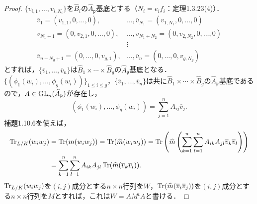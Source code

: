 \begin{proof}
  $\{v_{i,1},\ldots,v_{i,N_i}\}$を$\widehat{B}_i$の$\widehat{A}_\mathfrak{p}$基底とする（$N_i=e_if_i$：定理1.3.23(4)）．
  \begin{align*}
    \overline{v}_1=(v_{1,1},0,\ldots,0),&\ldots,\overline{v}_{N_1}=(v_{1,N_1},0,\ldots,0)\\
    \overline{v}_{N_1+1}=(0,v_{2,1},0,\ldots,0),&\ldots,\overline{v}_{N_1+N_2}=(0,v_{2,N_2},0,\ldots,0)\\
    &\vdots\\
    \overline{v}_{n-N_g+1}=(0,\ldots,0,v_{g,1}),&\ldots,\overline{v}_{n}=(0,\ldots,0,v_{g,N_g})
  \end{align*}
  とすれば，$\{\overline{v}_1,\ldots,\overline{v}_n\}$は$\widehat{B}_1\times\cdots\times\widehat{B}_g$の$\widehat{A}_\mathfrak{p}$基底となる．
  $\{(\phi_1(w_i), \ldots, \phi_g(w_i))\}_{1 \leq i \leq g}$，$\{\overline{v}_1, \ldots, \overline{v}_n\}$は共に$\widehat{B}_1\times\cdots\times\widehat{B}_g$の$\widehat{A}_\mathfrak{p}$基底であるので，$A \in \operatorname{GL}_n(\widehat{A}_\mathfrak{p})$が存在し，
  \[(\phi_1(w_i), \ldots, \phi_g(w_i)) = \sum_{j=1}^n A_{ij} \overline{v}_j.\]
  補題1.10.6を使えば，
  \begin{align*}
    \operatorname{Tr}_{L/K}(w_iw_j) &= \operatorname{Tr}(m(w_i w_j)) = \operatorname{Tr}(\widehat{m}(w_i w_j)) = \operatorname{Tr}\left(\widehat{m}\left(\sum_{k=1}^n \sum_{l=1}^n A_{ik} A_{jl} \overline{v}_k \overline{v}_{l} \right) \right) \\
                      & = \sum_{k=1}^n \sum_{l=1}^n A_{ik} A_{jl} \operatorname{Tr}(\widehat{m}(\overline{v}_k \overline{v}_{l})).
  \end{align*}
  $\operatorname{Tr}_{L/K}(w_iw_j)$を$(i,j)$成分とする$n\times n$行列を$W$，$\operatorname{Tr}(\widehat{m}(\overline{v}_i \overline{v}_{j}))$を$(i,j)$成分とする$n\times n$行列を$M$とすれば，これは$W=AM{}^tA$と書ける．


\end{proof}
